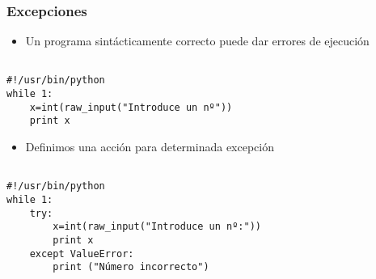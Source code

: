 







\begin{frame}[fragile]
\frametitle{Excepciones}
\begin{itemize}
\item Un programa sintácticamente correcto puede dar errores de ejecución
\end{itemize}

  \begin{footnotesize}
\begin{verbatim}

#!/usr/bin/python
while 1:
    x=int(raw_input("Introduce un nº"))
    print x

\end{verbatim}
  \end{footnotesize}

\end{frame}




\begin{frame}[fragile]

\begin{itemize}
\item  Definimos una acción para determinada excepción
\end{itemize}

  \begin{footnotesize}
\begin{verbatim}

#!/usr/bin/python
while 1:
    try:
        x=int(raw_input("Introduce un nº:"))
        print x
    except ValueError:
        print ("Número incorrecto")

\end{verbatim}
  \end{footnotesize}


\end{frame}




